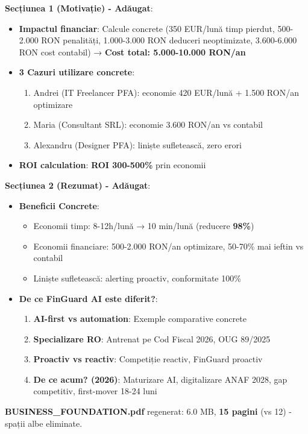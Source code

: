 \documentclass[11pt,a4paper]{article}
\begin{document}
\begin{tcolorbox}[colback=outputbackground,colframe=green!75!black,title=Output Generat]
\textbf{Secțiunea 1 (Motivație) - Adăugat}:
\begin{itemize}[leftmargin=*]
    \item \textbf{Impactul financiar}: Calcule concrete (350 EUR/lună timp pierdut, 500-2.000 RON penalități, 1.000-3.000 RON deduceri neoptimizate, 3.600-6.000 RON cost contabil) → \textbf{Cost total: 5.000-10.000 RON/an}
    \item \textbf{3 Cazuri utilizare concrete}:
    \begin{enumerate}
        \item Andrei (IT Freelancer PFA): economie 420 EUR/lună + 1.500 RON/an optimizare
        \item Maria (Consultant SRL): economie 3.600 RON/an vs contabil
        \item Alexandru (Designer PFA): liniște sufletească, zero erori
    \end{enumerate}
    \item \textbf{ROI calculation}: \textbf{ROI 300-500\%} prin economii
\end{itemize}

\textbf{Secțiunea 2 (Rezumat) - Adăugat}:
\begin{itemize}[leftmargin=*]
    \item \textbf{Beneficii Concrete}:
    \begin{itemize}
        \item Economii timp: 8-12h/lună → 10 min/lună (reducere \textbf{98\%})
        \item Economii financiare: 500-2.000 RON/an optimizare, 50-70\% mai ieftin vs contabil
        \item Liniște sufletească: alerting proactiv, conformitate 100\%
    \end{itemize}
    \item \textbf{De ce FinGuard AI este diferit?}:
    \begin{enumerate}
        \item \textbf{AI-first vs automation}: Exemple comparative concrete
        \item \textbf{Specializare RO}: Antrenat pe Cod Fiscal 2026, OUG 89/2025
        \item \textbf{Proactiv vs reactiv}: Competiție reactiv, FinGuard proactiv
        \item \textbf{De ce acum? (2026)}: Maturizare AI, digitalizare ANAF 2028, gap competitiv, first-mover 18-24 luni
    \end{enumerate}
\end{itemize}

\textbf{BUSINESS\_FOUNDATION.pdf} regenerat: 6.0 MB, \textbf{15 pagini} (vs 12) - spații albe eliminate.
\end{tcolorbox}
\end{document}

